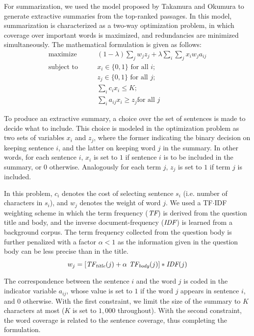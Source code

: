 \documentclass[a4paper,10pt,conference,compsocconf,final]{IEEEtran}
\newcommand{\var}[1]{\mbox{\emph{#1}}}
\newcommand{\ssvar}[1]{\mbox{\scriptsize\emph{#1}}}
\begin{document}
For summarization, we used the model proposed by Takamura and Okumura
\cite{takamura2009text} to generate extractive summaries from the
top-ranked passages.
In this model, summarization is characterized as a two-way
optimization problem, in which coverage over important words is
maximized, and redundancies are minimized simultaneously.
The mathematical formulation is given as follows:
\begin{equation}
\begin{split}
  \textrm{maximize} \qquad & (1-\lambda) \sum_{j} w_j z_j + \lambda \sum_{i}\sum_{j} x_i w_j a_{ij} \\
  \textrm{subject to} \qquad 
       & \textrm{$x_i \in \{0,1\}$ for all $i$}; \\ 
       & \textrm{$z_j \in \{0,1\}$ for all $j$}; \\
       & \sum\nolimits_{i} c_ix_i \le K; \\
       & \sum\nolimits_{i}^{} a_{ij}x_i \ge z_j \textrm{for all $j$} 
\end{split}
\end{equation}

To produce an extractive summary, a choice over the set of sentences
is made to decide what to include.
This choice is modeled in the optimization problem as two sets of
variables $x_i$ and $z_j$, where the former indicating the binary
decision on keeping sentence $i$, and the latter on keeping word $j$
in the summary.
In other words, for each sentence $i$, $x_i$ is set to $1$ if
sentence $i$ is to be included in the summary, or $0$ otherwise.
Analogously for each term $j$, $z_j$ is set to $1$ if term $j$ is
included.

In this problem, $c_i$ denotes the cost of selecting sentence $s_i$
(i.e.  number of characters in $s_i$), and $w_j$ denotes the weight of word
$j$.
We used a TF$\cdot$IDF weighting scheme in which the term frequency
($\var{TF}$) is derived from the question title and body, and the
inverse document-frequency ($\var{IDF}$) is learned from a background
corpus.
The term frequency collected from the question body is further
penalized with a factor $\alpha < 1$ as the information given in the
question body can be less precise than in the title.
\begin{equation}
  w_j = \left[ \var{TF}_{\ssvar{title}}(j) + \alpha ~ \var{TF}_{\ssvar{body}}(j) \right] * \var{IDF}(j)
\end{equation}

The correspondence between the sentence $i$ and the word $j$ is coded
in the indicator variable $a_{ij}$, whose value is set to $1$ if the
word $j$ appears in sentence $i$, and $0$ otherwise.
With the first constraint, we limit the size of the summary to $K$
characters at most ($K$ is set to $1{,}000$ throughout).
With the second constraint, the word coverage is related to the
sentence coverage, thus completing the formulation.
\end{document}

